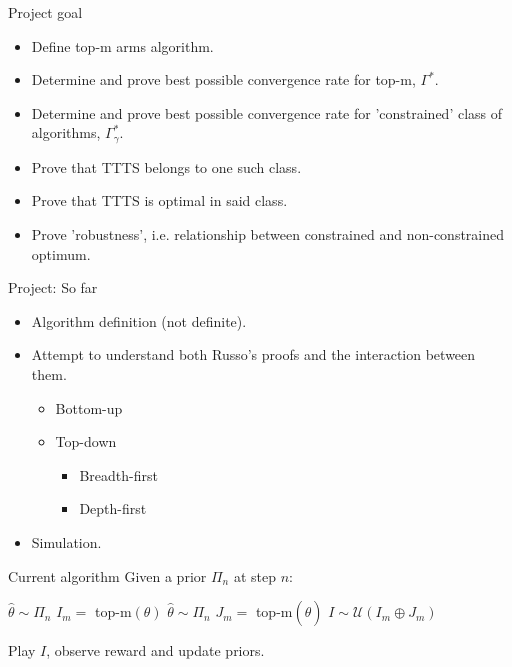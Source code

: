 \documentclass{beamer}
\begin{document}
\begin{frame}{Project goal}
    \begin{itemize}
        \item Define top-m arms algorithm.
        \item Determine and prove best possible convergence rate for top-m, $\Gamma^*$.
        \item Determine and prove best possible convergence rate for 'constrained' class of algorithms, $\Gamma_\gamma^*$.
        \item Prove that TTTS belongs to one such class.
        \item Prove that TTTS is optimal in said class.
        \item Prove 'robustness', i.e. relationship between constrained and non-constrained optimum.
    \end{itemize}
\end{frame}

\begin{frame}{Project: So far}
    \begin{itemize}
        \item Algorithm definition (not definite).
        \item Attempt to understand both Russo's proofs and the interaction between them.
            \begin{itemize}
                \item Bottom-up
                \item Top-down
                    \begin{itemize}
                        \item Breadth-first
                        \item Depth-first
                    \end{itemize}
            \end{itemize}
        \item Simulation.
    \end{itemize}
\end{frame}

\begin{frame}{Current algorithm}
    Given a prior $\Pi_n$ at step $n$:
    \begin{algorithmic}
    \State $\hat{\theta} \sim \Pi_n$
    \State $I_m = $ top-m$(\theta)$
    \Repeat
        \State $\hat{\theta} \sim \Pi_n$
        \State $J_m = $ top-m$(\hat{\theta})$
    \State $I \sim \mathcal{U}(I_m \oplus J_m)$
    \end{algorithmic}
    Play $I$, observe reward and update priors.
\end{frame}
\end{document}
